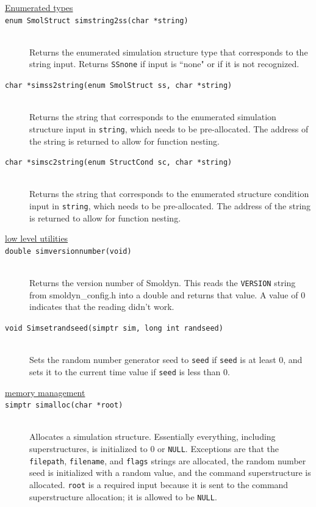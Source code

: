 \documentclass {scrbook}
\newcommand {\ttt} {\texttt}
\begin{document}
\begin{description}
\item[\underline{Enumerated types}]

\item[\ttt{enum SmolStruct simstring2ss(char *string)}]
\hfill \\
Returns the enumerated simulation structure type that corresponds to the string input. Returns \ttt{SSnone} if input is ``none" or if it is not recognized.

\item[\ttt{char *simss2string(enum SmolStruct ss, char *string)}]
\hfill \\
Returns the string that corresponds to the enumerated simulation structure input in \ttt{string}, which needs to be pre-allocated. The address of the string is returned to allow for function nesting.

\item[\ttt{char *simsc2string(enum StructCond sc, char *string)}]
\hfill \\
Returns the string that corresponds to the enumerated structure condition input in \ttt{string}, which needs to be pre-allocated. The address of the string is returned to allow for function nesting.

\item[\underline{low level utilities}]

\item[\ttt{double simversionnumber(void)}]
\hfill \\
Returns the version number of Smoldyn. This reads the \ttt{VERSION} string from smoldyn\_config.h into a double and returns that value. A value of 0 indicates that the reading didn't work.

\item[\ttt{void Simsetrandseed(simptr sim, long int randseed)}]
\hfill \\
Sets the random number generator seed to \ttt{seed} if \ttt{seed} is at least 0, and sets it to the current time value if \ttt{seed} is less than 0.

\item[\underline{memory management}]

\item[\ttt{simptr simalloc(char *root)}]
\hfill \\
Allocates a simulation structure. Essentially everything, including superstructures, is initialized to 0 or \ttt{NULL}. Exceptions are that the \ttt{filepath}, \ttt{filename}, and \ttt{flags} strings are allocated, the random number seed is initialized with a random value, and the command superstructure is allocated. \ttt{root} is a required input because it is sent to the command superstructure allocation; it is allowed to be \ttt{NULL}.


\end{description}
\end{document}
